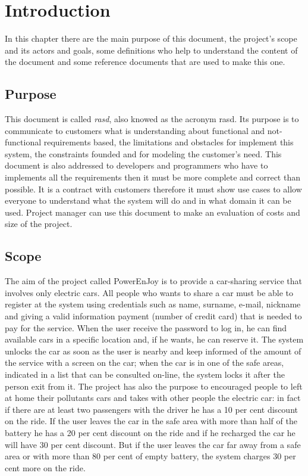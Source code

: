 \section{Introduction} \label{sec:intro}
In this chapter there are the main purpose of this document, the project's scope and its actors and goals, some definitions who help to understand the content of the document and some reference documents that are used to make this one. 

\subsection{Purpose} \label{subsec:purpose}
This document is called \emph{\acl{rasd}}, also knowed as the acronym \acs{rasd}. Its purpose is to communicate to customers what is understanding about functional and not-functional requirements based, the limitations and obstacles for implement this system, the constraints founded and for modeling the customer's need. This document is also addressed to developers and programmers who have to implements all the requirements then it must be more complete and correct than possible. It is a contract with customers therefore it must show use cases to allow everyone to understand what the system will do and in what domain it can be used. Project manager can use this document to make an evaluation of costs and size of the project.


\subsection{Scope} \label{subsec:scope}
The aim of the project called PowerEnJoy is to provide a car-sharing service that involves only electric cars. All people who wants to share a car must be able to register at the system using credentials such as name, surname, e-mail, nickname and giving a valid information payment (number of credit card) that is needed to pay for the service. When the user receive the password to log in, he can find available cars in a specific location and, if he wants, he can reserve it. The system unlocks the car as soon as the user is nearby and keep informed of the amount of the service with a screen on the car; when the car is in one of the safe areas, indicated in a list that can be consulted on-line, the system locks it after the person exit from it. The project has also the purpose to encouraged people to left at home their pollutants cars and takes with other people the electric car: in fact if there are at least two passengers with the driver he has a 10 per cent discount on the ride. If the user leaves the car in the safe area with more than half of the battery he has a 20 per cent discount on the ride and if he recharged the car he will have 30 per cent discount. But if the user leaves the car far away from a safe area or with more than 80 per cent of empty battery, the system charges 30 per cent more on the ride.

